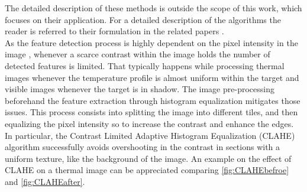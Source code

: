 The detailed description of these methods is outside the scope of this work, which focuses on their application. For a detailed description of the algorithms the reader is referred to their formulation in the related papers \cite{rosten2005fusing,rublee2011orb,leutenegger2011brisk,lowe2004sift,bay2006surf}.\\
As the feature detection process is highly dependent on the pixel intensity in the image \cite{rondao2020benchmarking}, whenever a scarce contrast within the image holds the number of detected features is limited. That typically happens while processing thermal images whenever the temperature profile is almost uniform within the target and visible images whenever the target is in shadow. 
The image pre-processing beforehand the feature extraction through histogram equalization mitigates those issues.
This process consists into splitting the image into different tiles, and then equalizing the pixel intensity so to increase the contrast and enhance the edges. In particular, the Contrast Limited Adaptive Histogram Equalization (CLAHE) \cite{zuiderveld1994contrast} algorithm successfully avoids overshooting in the contrast in sections with a uniform texture, like the background of the image. An example on the effect of CLAHE on a thermal image can be appreciated comparing \cref{fig:CLAHEbefroe} and \cref{fig:CLAHEafter}.

